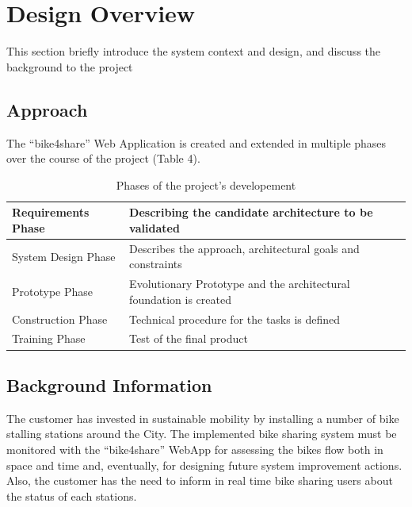 \documentclass{article}
\begin{document}
\section{Design Overview}
This section briefly introduce the system context and design, and discuss the background to the project
\subsection{Approach}
The “bike4share” Web Application is created and extended in multiple phases over the course of the project (Table 4).
\begin{table} [H]
    \begin{center}
        \begin{tabular}{|l|p{}|}
            \hline
            Requirements Phase &   Describing the candidate architecture to be validated         \\
            \hline
            System Design Phase &  
            Describes the approach, architectural goals and constraints \\
            \hline
            Prototype Phase &  
            Evolutionary Prototype and the architectural foundation is created    \\
            \hline
            Construction Phase & Technical procedure for the tasks is defined \\
            \hline
            Training Phase & Test of the final product
            \\
            \hline
        \end{tabular}
    \end{center}
\caption{Phases of the project's developement}
\end{table}

\subsection{Background Information}

The  customer has invested in sustainable mobility by installing a number of bike stalling stations around the City. The implemented bike sharing system must be monitored with the “bike4share” WebApp for assessing the bikes flow both in space and time and, eventually, for designing future system improvement actions. 
Also, the customer has the need to inform in real time bike sharing users about the status of each stations.
\end{document}
